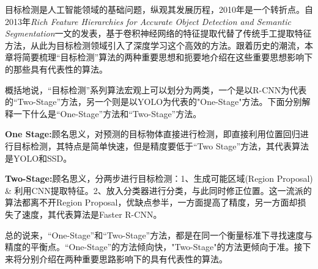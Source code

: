 目标检测是人工智能领域的基础问题\cite{dl}，纵观其发展历程，2010年是一个转折点。自2013年\textit{Rich Feature Hierarchies for Accurate Object Detection and Semantic Segmentation}\cite{rcnn}一文的发表，基于卷积神经网络的特征提取代替了传统手工提取特征方法，从此为目标检测领域引入了深度学习这个高效的方法。跟着历史的潮流，本章将简要梳理“目标检测”算法的两种重要思想和扼要地介绍在这些重要思想影响下的那些具有代表性的算法。

概括地说，“目标检测”系列算法宏观上可以划分为两类，一个是以R-CNN\cite{rcnn}为代表的“Two-Stage”方法，另一个则是以YOLO\cite{yolo}为代表的"One-Stage"方法。下面分别解释一下什么是“One-Stage”方法和“Two-Stage”方法。

\textbf{One Stage:}顾名思义，对预测的目标物体直接进行检测，即直接利用位置回归进行目标检测，其特点是简单快速，但是精度要低于“Two Stage”方法，其代表算法是YOLO\cite{yolo}和SSD\cite{ssd}。

\textbf{Two-Stage:}顾名思义，分两步进行目标检测：1、生成可能区域(Region Proposal) \& 利用CNN提取特征。2、放入分类器进行分类，与此同时修正位置。这一流派的算法都离不开Region Proposal，优缺点参半，一方面提高了精度，另一方面却损失了速度，其代表算法是Faster R-CNN\cite{fasterrcnn}。

总的说来，“One-Stage”和“Two-Stage”方法，都是在同一个衡量标准下寻找速度与精度的平衡点。“One-Stage”的方法倾向快，"Two-Stage"的方法更倾向于准。接下来将分别介绍在两种重要思路影响下的具有代表性的算法。

